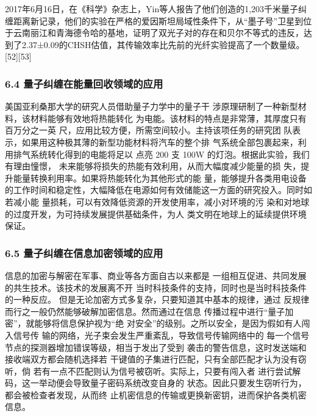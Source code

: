 2017年6月16日，在《科学》杂志上，Yin等人报告了他们创造的1,203千米量子纠缠距离新记录，他们的实验在严格的爱因斯坦局域性条件下，从“墨子号”卫星到位于云南丽江和青海德令哈的基地，证明了双光子对的存在和贝尔不等式的违反，达到了2.37±0.09的CHSH估值，其传输效率比先前的光纤实验提高了一个数量级。[52][53]

\subsubsection{6.4 量子纠缠在能量回收领域的应用}
美国亚利桑那大学的研究人员借助量子力学中的量子干 涉原理研制了一种新型材料，该材料能够有效地将热能转化 为电能。该材料的特点是非常薄，其厚度只有百万分之一英 尺，应用比较方便，所需空间较小。主持该项任务的研究团 队表示，如果用这种极其薄的新型功能材料将汽车的整个排 气系统全部包裹起来，利用排气系统转化得到的电能将足以 点亮 200 支 100W 的灯泡。根据此实验，我们有理由憧憬， 未来能够将损失的热能有效利用，从而大幅度减少能量的损 失，提升能量转换利用率。如果将热能转化为其他形式的能 量，能够提升各类用电设备的工作时间和稳定性，大幅降低在电源如何有效储能这一方面的研究投入。同时如若减小能 量损耗，可以有效降低资源的开发使用率，减小对环境的污 染和对地球的过度开发，为可持续发展提供基础条件，为人 类文明在地球上的延续提供环境保证。

\subsubsection{6.5 量子纠缠在信息加密领域的应用}
信息的加密与解密在军事、商业等各方面自古以来都是 一组相互促进、共同发展的共生技术。该技术的发展离不开 当时科技条件的支持，同时也是当时科技条件的一种反应。 但是无论加密方式多复杂，只要知道其中基本的规律，通过 反规律而行之一般仍然能够破解加密信息。然而通过在信息 传播过程中进行“量子加密”，就能够将信息保护视为“绝 对安全”的级别。之所以安全，是因为假如有人闯入信号传 输的网络，光子束会发生严重紊乱，导致信号传输网络中的 每一个信号节点的探测器增加错误等级，相当于发出了受到 袭击的警告信息，这时发送端和接收端双方都会随机选择若 干键值的子集进行匹配，只有全部匹配才认为没有窃听，倘 若有一点不匹配则认为信号被窃听。实际上，只要有闯入者 进行尝试解码，这一举动便会导致量子密码系统改变自身的 状态。因此只要发生窃听行为，都会被检查者发现，从而终 止机密信息的传输或更换新密钥，进而保护各类机密信息。

